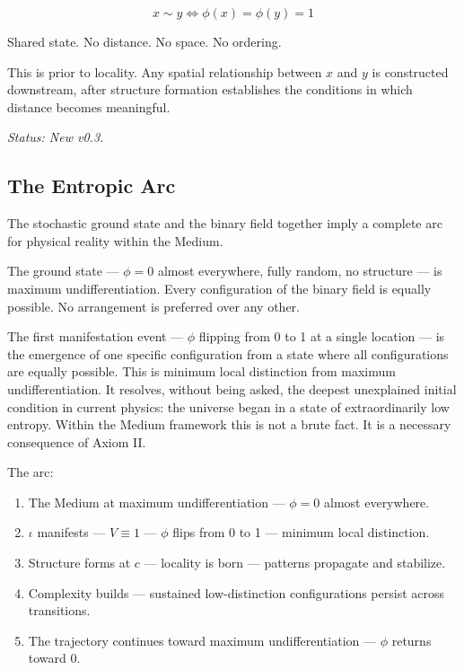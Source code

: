 \documentclass[11pt,letterpaper]{article}
\begin{document}
\begin{equation}
x \sim y \iff \phi(x) = \phi(y) = 1
\end{equation}

\begin{center}
Shared state. No distance. No space. No ordering.
\end{center}

This is prior to locality. Any spatial relationship between \(x\) and \(y\) is constructed downstream, after structure formation establishes the conditions in which distance becomes meaningful.

\emph{Status: New v0.3.}
\subsection{The Entropic Arc}
\label{sec:org716d893}

The stochastic ground state and the binary field together imply a complete arc for physical reality within the Medium.

The ground state --- \(\phi = 0\) almost everywhere, fully random, no structure --- is maximum undifferentiation. Every configuration of the binary field is equally possible. No arrangement is preferred over any other.

The first manifestation event --- \(\phi\) flipping from 0 to 1 at a single location --- is the emergence of one specific configuration from a state where all configurations are equally possible. This is minimum local distinction from maximum undifferentiation. It resolves, without being asked, the deepest unexplained initial condition in current physics: the universe began in a state of extraordinarily low entropy. Within the Medium framework this is not a brute fact. It is a necessary consequence of Axiom II.

The arc:

\begin{enumerate}
\item The Medium at maximum undifferentiation --- \(\phi = 0\) almost everywhere.
\item \(\iota\) manifests --- \(V \equiv 1\) --- \(\phi\) flips from 0 to 1 --- minimum local distinction.
\item Structure forms at \(c\) --- locality is born --- patterns propagate and stabilize.
\item Complexity builds --- sustained low-distinction configurations persist across transitions.
\item The trajectory continues toward maximum undifferentiation --- \(\phi\) returns toward 0.
\end{enumerate}
\end{document}
